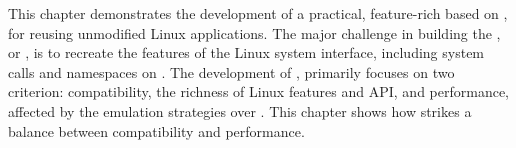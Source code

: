 This chapter
demonstrates the development of a practical, feature-rich \libos{} based on
\thehostabi{},
for reusing unmodified Linux applications.
The major challenge in building the \libos{},
or \thelibos{},
is to recreate the features of the Linux system interface, including
system calls and namespaces on \thehostabi{}. %
The development of \thelibos{},
primarily focuses on two criterion:
compatibility, the richness of Linux features and API,
and performance, affected by
the emulation strategies over \thehostabi{}.
This chapter shows how \thelibos{} strikes a balance between compatibility and performance.




